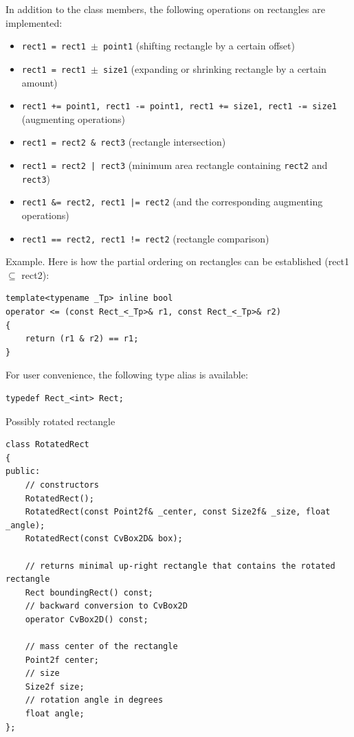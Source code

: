 In addition to the class members, the following operations on rectangles are implemented:
\begin{itemize}
    \item \texttt{rect1 = rect1 $\pm$ point1} (shifting rectangle by a certain offset)
    \item \texttt{rect1 = rect1 $\pm$ size1} (expanding or shrinking rectangle by a certain amount)
    \item \texttt{rect1 += point1, rect1 -= point1, rect1 += size1, rect1 -= size1} (augmenting operations)
    \item \texttt{rect1 = rect2 \& rect3} (rectangle intersection)
    \item \texttt{rect1 = rect2 | rect3} (minimum area rectangle containing \texttt{rect2} and \texttt{rect3})
    \item \texttt{rect1 \&= rect2, rect1 |= rect2} (and the corresponding augmenting operations)
    \item \texttt{rect1 == rect2, rect1 != rect2} (rectangle comparison)
\end{itemize}

Example. Here is how the partial ordering on rectangles can be established (rect1 $\subseteq$ rect2):
\begin{lstlisting}
template<typename _Tp> inline bool
operator <= (const Rect_<_Tp>& r1, const Rect_<_Tp>& r2)
{
    return (r1 & r2) == r1;
}
\end{lstlisting}

For user convenience, the following type alias is available:
\begin{lstlisting}
typedef Rect_<int> Rect;
\end{lstlisting}

\label{RotatedRect}
Possibly rotated rectangle

\begin{lstlisting}
class RotatedRect
{
public:
    // constructors
    RotatedRect();
    RotatedRect(const Point2f& _center, const Size2f& _size, float _angle);
    RotatedRect(const CvBox2D& box);
    
    // returns minimal up-right rectangle that contains the rotated rectangle
    Rect boundingRect() const;
    // backward conversion to CvBox2D
    operator CvBox2D() const;
    
    // mass center of the rectangle
    Point2f center;
    // size
    Size2f size;
    // rotation angle in degrees
    float angle;
};
\end{lstlisting}

